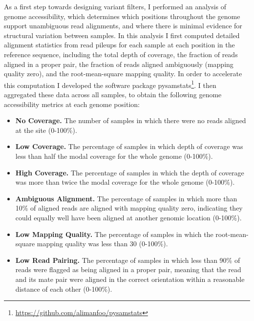 \begin{refsection}
As a first step towards designing variant filters, I performed an analysis of genome accessibility, which determines which positions throughout the genome support unambiguous read alignments, and where there is minimal evidence for structural variation between samples. 
%
In this analysis I first computed detailed alignment statistics from read pileups for each sample at each position in the reference sequence, including the total depth of coverage, the fraction of reads aligned in a proper pair, the fraction of reads aligned ambiguously (mapping quality zero), and the root-mean-square mapping quality.
%
In order to accelerate this computation I developed the software package pysamstats\footnote{\url{https://github.com/alimanfoo/pysamstats}}.
%
I then aggregated these data across all samples, to obtain the following genome accessibility metrics at each genome position:
%
\begin{itemize}
%
\item \textbf{No Coverage.} The number of samples in which there were no reads aligned at the site (0-100\%).
%
\item \textbf{Low Coverage.} The percentage of samples in which depth of coverage was less than half the modal coverage for the whole genome (0-100\%).
%
\item \textbf{High Coverage.} The percentage of samples in which the depth of coverage was more than twice the modal coverage for the whole genome (0-100\%).
%
\item \textbf{Ambiguous Alignment.} The percentage of samples in which more than 10\% of aligned reads are aligned with mapping quality zero, indicating they could equally well have been aligned at another genomic location (0-100\%).
%
\item \textbf{Low Mapping Quality.} The percentage of samples in which the root-mean-square mapping quality was less than 30 (0-100\%).
%  
\item \textbf{Low Read Pairing.} The percentage of samples in which less than 90\% of reads were flagged as being aligned in a proper pair, meaning that the read and its mate pair were aligned in the correct orientation within a reasonable distance of each other (0-100\%).
\end{itemize}



\end{refsection}

